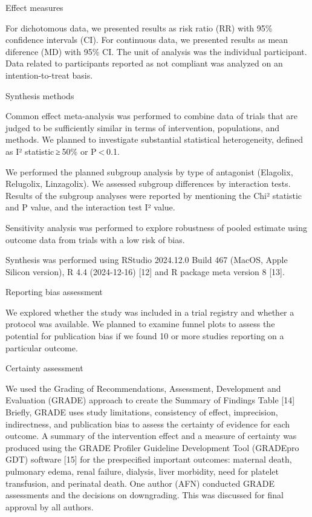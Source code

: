 \documentclass[
  letterpaper,
  DIV=11,
  numbers=noendperiod]{scrartcl}
\begin{document}
Effect measures

For dichotomous data, we presented results as risk ratio (RR) with 95\%
confidence intervals (CI). For continuous data, we presented results as
mean diference (MD) with 95\% CI. The unit of analysis was the
individual participant. Data related to participants reported as not
compliant was analyzed on an intention-to-treat basis.

Synthesis methods

Common effect meta-analysis was performed to combine data of trials that
are judged to be sufficiently similar in terms of intervention,
populations, and methods. We planned to investigate substantial
statistical heterogeneity, defined as I² statistic ≥ 50\% or
P \textless{} 0.1.

We performed the planned subgroup analysis by type of antagonist
(Elagolix, Relugolix, Linzagolix). We assessed subgroup differences by
interaction tests. Results of the subgroup analyses were reported by
mentioning the Chi² statistic and P value, and the interaction test I²
value.

Sensitivity analysis was performed to explore robustness of pooled
estimate using outcome data from trials with a low risk of bias.

Synthesis was performed using RStudio 2024.12.0 Build 467 (MacOS, Apple
Silicon version), R 4.4 (2024-12-16) {[}12{]} and R package meta version
8 {[}13{]}.

Reporting bias assessment

We explored whether the study was included in a trial registry and
whether a protocol was available. We planned to examine funnel plots to
assess the potential for publication bias if we found 10 or more studies
reporting on a particular outcome.

Certainty assessment

We used the Grading of Recommendations, Assessment, Development and
Evaluation (GRADE) approach to create the Summary of Findings Table
{[}14{]} Briefly, GRADE uses study limitations, consistency of effect,
imprecision, indirectness, and publication bias to assess the certainty
of evidence for each outcome. A summary of the intervention effect and a
measure of certainty was produced using the GRADE Profiler Guideline
Development Tool (GRADEpro GDT) software {[}15{]} for the prespecified
important outcomes: maternal death, pulmonary edema, renal failure,
dialysis, liver morbidity, need for platelet transfusion, and perinatal
death. One author (AFN) conducted GRADE assessments and the decisions on
downgrading. This was discussed for final approval by all authors.
\end{document}
